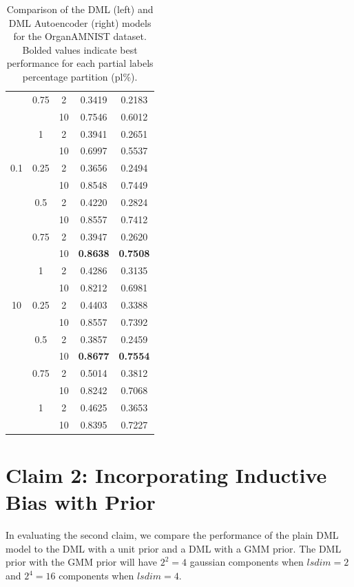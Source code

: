 \documentclass[./dissertation.tex]{subfiles}
\begin{document}
\begin{table}[]
\begin{tabular}{|c|c|c|c|c|}
             & 0.75 & 2 & 0.3419 & 0.2183 \\
             &  & 10 & 0.7546 & 0.6012 \\
             & 1 & 2 & 0.3941 & 0.2651 \\
             &  & 10 & 0.6997 & 0.5537 \\
            0.1 & 0.25 & 2 & 0.3656 & 0.2494 \\
             &  & 10 & 0.8548 & 0.7449 \\
             & 0.5 & 2 & 0.4220 & 0.2824 \\
             &  & 10 & 0.8557 & 0.7412 \\
             & 0.75 & 2 & 0.3947 & 0.2620 \\
             &  & 10 & \textbf{0.8638} & \textbf{0.7508} \\
             & 1 & 2 & 0.4286 & 0.3135 \\
             &  & 10 & 0.8212 & 0.6981 \\
            10 & 0.25 & 2 & 0.4403 & 0.3388 \\
             &  & 10 & 0.8557 & 0.7392 \\
             & 0.5 & 2 & 0.3857 & 0.2459 \\
             &  & 10 & \textbf{0.8677} & \textbf{0.7554} \\
             & 0.75 & 2 & 0.5014 & 0.3812 \\
             &  & 10 & 0.8242 & 0.7068 \\
             & 1 & 2 & 0.4625 & 0.3653 \\
             &  & 10 & 0.8395 & 0.7227 \\
            \hline
       \end{tabular}
       \caption{Comparison of the DML (left) and DML Autoencoder (right) models for the OrganAMNIST dataset. Bolded values indicate best performance for each partial labels percentage partition (pl\%).\\}
       \label{tab:my_label}
   \end{table}
   
   
    \section{Claim 2: Incorporating Inductive Bias with Prior}
    In evaluating the second claim, we compare the performance of the plain DML model to the DML with a unit prior and a DML with a GMM prior. The DML prior with the GMM prior will have $2^{2} = 4$ gaussian components when $lsdim = 2$ and $2^{4} = 16$ components when $lsdim = 4$.  \\
    
\end{document}
